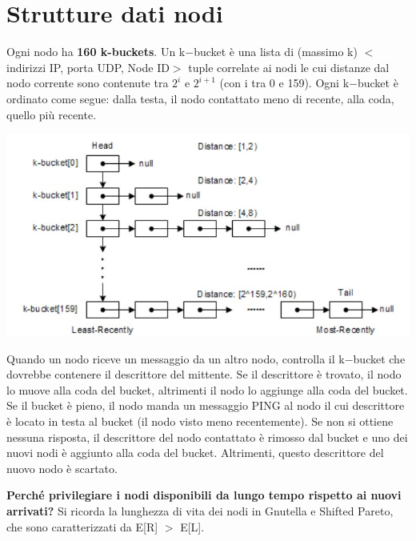 \section{Strutture dati nodi}
Ogni nodo ha \textbf{160 k-buckets}. Un k$-$bucket è una lista di (massimo k) $<$indirizzi IP, porta UDP, Node ID$>$ tuple correlate ai nodi le cui distanze dal nodo corrente sono contenute tra $2^i$ e $2^{i+1}$ (con i tra 0 e 159). Ogni k$-$bucket è ordinato come segue: dalla testa, il nodo contattato meno di recente, alla coda, quello più recente. 
\begin{center}
    \includegraphics[scale = 0.4]{Images/P2P/KademliaNodeStructure.jpg}
\end{center}
Quando un nodo riceve un messaggio da un altro nodo, controlla il k$-$bucket che dovrebbe contenere il descrittore del mittente. Se il descrittore è trovato, il nodo lo muove alla coda del bucket, altrimenti il nodo lo aggiunge alla coda del bucket. Se il bucket è pieno, il nodo manda un messaggio PING al nodo il cui descrittore è locato in testa al bucket (il nodo visto meno recentemente). Se non si ottiene nessuna risposta, il descrittore del nodo contattato è rimosso dal bucket e uno dei nuovi nodi è aggiunto alla coda del bucket. Altrimenti, questo descrittore del nuovo nodo è scartato. 

\textbf{Perché privilegiare i nodi disponibili da lungo tempo rispetto ai nuovi arrivati?} Si ricorda la lunghezza di vita dei nodi in Gnutella e Shifted Pareto, che sono caratterizzati da E[R] $>$ E[L]. 


